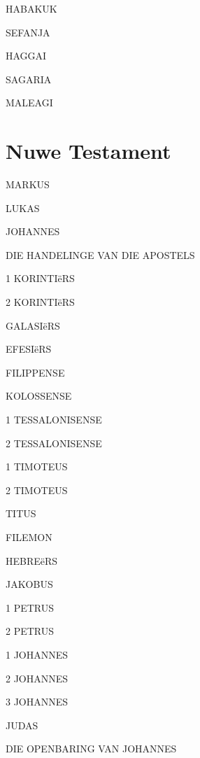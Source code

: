 \documentclass[twoside,twocolumn,letterpaper]{book}
\newcommand{\jnumChapters}{0}
\begin{document}
HABAKUK

SEFANJA

HAGGAI

SAGARIA

MALEAGI





\part*{Nuwe Testament}
\setlength{\columnseprule}{0.0pt}
\renewcommand{\jnumChapters}{0}



MARKUS

LUKAS

JOHANNES

DIE HANDELINGE VAN DIE APOSTELS











1 KORINTIëRS

2 KORINTIëRS

GALASIëRS

EFESIëRS

FILIPPENSE

KOLOSSENSE

1 TESSALONISENSE

2 TESSALONISENSE

1 TIMOTEUS

2 TIMOTEUS

TITUS

FILEMON

HEBREëRS

JAKOBUS

1 PETRUS

2 PETRUS

1 JOHANNES

2 JOHANNES

3 JOHANNES

JUDAS

DIE OPENBARING VAN JOHANNES
\end{document}
